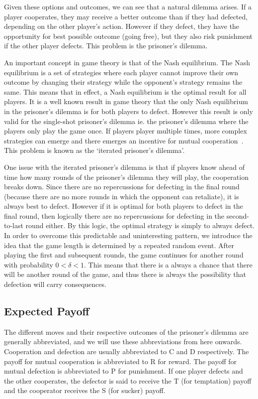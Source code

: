 \documentclass[a4paper,12pt]{article}
\begin{document}
Given these options and outcomes, we can see that a natural dilemma arises.
If a player cooperates, they may receive a better outcome than if they had defected, depending on the other player's action.
However if they defect, they have the opportunity for best possible outcome (going free), but they also risk punishment if the other player defects.
This problem is the prisoner's dilemma.

An important concept in game theory is that of the Nash equilibrium.
The Nash equilibrium is a set of strategies where each player cannot improve their own outcome by changing their strategy while the opponent's strategy remains the same.
This means that in effect, a Nash equilibrium is the optimal result for all players.
It is a well known result in game theory that the only Nash equilibrium in the prisoner's dilemma is for both players to defect.
However this result is only valid for the single-shot prisoner's dilemma ie. the prisoner's dilemma where the players only play the game once.
If players player multiple times, more complex strategies can emerge and there emerges an incentive for mutual cooperation~\cite{trivers}.
This problem is known as the `iterated prisoner's dilemma'.

One issue with the iterated prisoner's dilemma is that if players know ahead of time how many rounds of the prisoner's dilemma they will play, the cooperation breaks down.
Since there are no repercussions for defecting in the final round (because there are no more rounds in which the opponent can retaliate), it is always best to defect.
However if it is optimal for both players to defect in the final round, then logically there are no repercussions for defecting in the second-to-last round either.
By this logic, the optimal strategy is simply to always defect.
In order to overcome this predictable and uninteresting pattern, we introduce the idea that the game length is determined by a repeated random event.
After playing the first and subsequent rounds, the game continues for another round with probability $0 < \delta < 1$.
This means that there is a always a chance that there will be another round of the game, and thus there is always the possibility that defection will carry consequences.

\subsection*{Expected Payoff}

The different moves and their respective outcomes of the prisoner's dilemma are generally abbreviated, and we will use these abbreviations from here onwards.
Cooperation and defection are usually abbreviated to C and D respectively.
The payoff for mutual cooperation is abbreviated to R for reward.
The payoff for mutual defection is abbreviated to P for punishment.
If one player defects and the other cooperates, the defector is said to receive the T (for temptation) payoff and the cooperator receives the S (for sucker) payoff.
\end{document}
